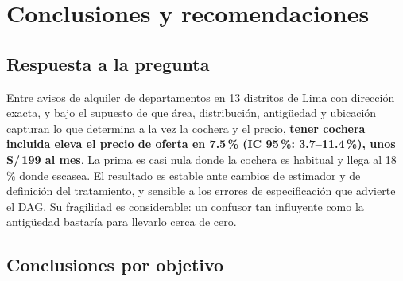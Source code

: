 \chapter{Conclusiones y recomendaciones}\label{cap:conclusiones}

\section{Respuesta a la pregunta}

Entre avisos de alquiler de departamentos en 13 distritos de Lima con dirección exacta, y bajo el supuesto de que área, distribución, antigüedad y ubicación capturan lo que determina a la vez la cochera y el precio, \textbf{tener cochera incluida eleva el precio de oferta en 7.5\,\% (IC 95\,\%: 3.7--11.4\,\%), unos S/\,199 al mes}. La prima es casi nula donde la cochera es habitual y llega al 18\,\% donde escasea. El resultado es estable ante cambios de estimador y de definición del tratamiento, y sensible a los errores de especificación que advierte el DAG. Su fragilidad es considerable: un confusor tan influyente como la antigüedad bastaría para llevarlo cerca de cero.

\section{Conclusiones por objetivo}

